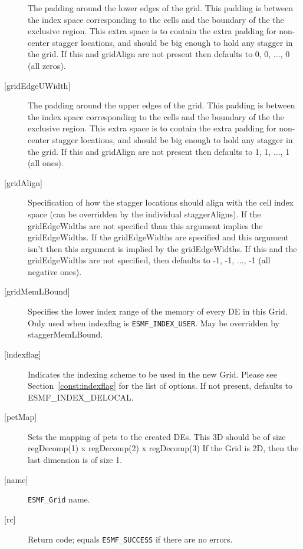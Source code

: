 \begin{description}
        The padding around the lower edges of the grid. This padding is between
        the index space corresponding to the cells and the boundary of the
        the exclusive region. This extra space is to contain the extra
        padding for non-center stagger locations, and should be big enough
        to hold any stagger in the grid. If this and gridAlign are not present then
        defaults to 0, 0, ..., 0 (all zeros).
   \item[{[gridEdgeUWidth]}]
        The padding around the upper edges of the grid. This padding is between
        the index space corresponding to the cells and the boundary of the
        the exclusive region. This extra space is to contain the extra
        padding for non-center stagger locations, and should be big enough
        to hold any stagger in the grid. If this and gridAlign are not present then
        defaults to 1, 1, ..., 1 (all ones).
   \item[{[gridAlign]}]
       Specification of how the stagger locations should align with the cell
       index space (can be overridden by the individual staggerAligns). If
       the gridEdgeWidths are not specified than this argument
       implies the gridEdgeWidths. If the gridEdgeWidths are specified and this argument isn't
       then this argument is implied by the gridEdgeWidths.
       If this and the gridEdgeWidths are not specified, then defaults to
      -1, -1, ..., -1 (all negative ones).
   \item[{[gridMemLBound]}]
        Specifies the lower index range of the memory of every DE in this Grid.
        Only used when indexflag is {\tt ESMF\_INDEX\_USER}. May be overridden
        by staggerMemLBound.
   \item[{[indexflag]}]
        Indicates the indexing scheme to be used in the new Grid. Please see
        Section~\ref{const:indexflag} for the list of options. If not present,
        defaults to ESMF\_INDEX\_DELOCAL.
   \item[{[petMap]}]
         Sets the mapping of pets to the created DEs. This 3D
         should be of size regDecomp(1) x regDecomp(2) x regDecomp(3)
         If the Grid is 2D, then the last dimension is of size 1.
   \item[{[name]}]
        {\tt ESMF\_Grid} name.
   \item[{[rc]}]
        Return code; equals {\tt ESMF\_SUCCESS} if there are no errors.
   \end{description}
   
 
